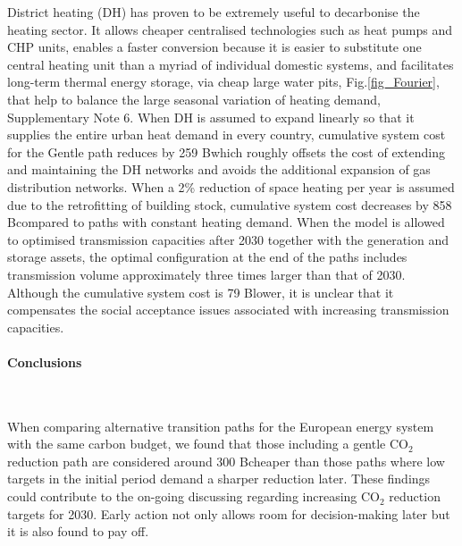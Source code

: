 \documentclass[5p]{elsarticle} %
\begin{document}
District heating (DH) has proven to be extremely useful to decarbonise the heating sector. It allows cheaper centralised technologies such as heat pumps and CHP units, enables a faster conversion because it is easier to substitute one central heating unit than a myriad of individual domestic systems, and facilitates long-term thermal energy storage, via cheap large water pits, Fig.\ref{fig_Fourier}, that help to balance the large seasonal variation of heating demand, Supplementary Note 6. When DH is assumed to expand linearly so that it supplies the entire urban heat demand in every country, cumulative system cost for the Gentle path reduces by 259 B\EUR which roughly offsets the cost of extending and maintaining the DH networks and avoids the additional expansion of gas distribution networks. When a 2\% reduction of space heating per year is assumed due to the retrofitting of building stock, cumulative system cost decreases by 858 B\EUR compared to paths with constant heating demand. When the model is allowed to optimised transmission capacities after 2030 together with the generation and storage assets, the optimal configuration at the end of the paths includes transmission volume approximately three times larger than that of 2030. Although the cumulative system cost is 79 B\EUR lower, it is unclear that it compensates the social acceptance issues associated with increasing transmission capacities. 

\paragraph{\textbf{Conclusions}} \

When comparing alternative transition paths for the European energy system with the same carbon budget, we found that those including a gentle CO$_2$ reduction path are considered around 300 B\EUR cheaper than those paths where low targets in the initial period demand a sharper reduction later. These findings could contribute to the on-going discussing regarding increasing CO$_2$ reduction targets for 2030. Early action not only allows room for decision-making later but it is also found to pay off.  
\end{document}
